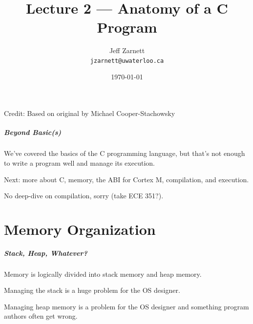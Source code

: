 

\title{Lecture 2 --- Anatomy of a C Program }

\author{Jeff Zarnett \\ \small \texttt{jzarnett@uwaterloo.ca}}
\date{\today}




\begin{frame}
  \titlepage

\small{Credit: Based on original by Michael Cooper-Stachowsky}

 \end{frame}

\begin{frame}
\frametitle{Beyond Basic(s)}

We've covered the basics of the C programming language, but that's not enough to write a program well and manage its execution.

Next: more about C, memory, the ABI for Cortex M, compilation, and execution.

No deep-dive on compilation, sorry (take ECE 351?).

\end{frame}

\part{Memory Organization}

\begin{frame}
\partpage
\end{frame}

\begin{frame}
\frametitle{Stack, Heap, Whatever?}

Memory is logically divided into stack memory and heap memory.

Managing the stack is a huge problem for the OS designer.

Managing heap memory is a problem for the OS designer and something program authors often get wrong.

\end{frame}

